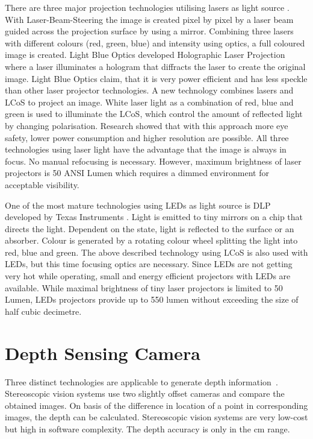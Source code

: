 There are three major projection technologies utilising lasers as light source \cite{Mertens:p40QFV-L}. With Laser-Beam-Steering the image is created pixel by pixel by a laser beam guided across the projection surface by using a mirror. Combining three lasers with different colours (red, green, blue) and intensity using optics, a full coloured image is created. Light Blue Optics \cite{Blue:2014ab} developed Holographic Laser Projection where a laser illuminates a hologram that diffracts the laser to create the original image. Light Blue Optics claim, that it is very power efficient and has less speckle than other laser projector technologies. A new technology combines lasers and \ac{LCoS} to project an image. White laser light as a combination of red, blue and green is used to illuminate the \ac{LCoS}, which control the amount of reflected light by changing polarisation. Research showed \cite{Guttag:2011wd} that with this approach more eye safety, lower power consumption and higher resolution are possible. All three technologies using laser light have the advantage that the image is always in focus. No manual refocusing is necessary. However, maximum brightness of laser projectors is 50 ANSI Lumen which requires a dimmed environment for acceptable visibility. 

One of the most mature technologies using LEDs as light source is \ac{DLP} developed by Texas Instruments \cite{Rukzio:2012hj}.
Light is emitted to tiny mirrors on a chip that directs the light. Dependent on the state, light is reflected to the surface or an absorber. Colour is generated by a rotating colour wheel splitting the light into red, blue and green. The above described technology using \ac{LCoS} is also used with LEDs, but this time focusing optics are necessary. Since LEDs are not getting very hot while operating, small and energy efficient projectors with LEDs are available. While maximal brightness of tiny laser projectors is limited to 50 Lumen, LEDs projectors provide up to 550 lumen without exceeding the size of half cubic decimetre.

\section{Depth Sensing Camera}\label{sec:depthsensingcamera}
Three distinct technologies are applicable to generate depth information~\cite{Ko:2012vp}. Stereoscopic vision systems use two slightly offset cameras and compare the obtained images. On basis of the difference in location of a point in corresponding images, the depth can be calculated. Stereoscopic vision systems are very low-cost but high in software complexity. The depth accuracy is only in the cm range. 

